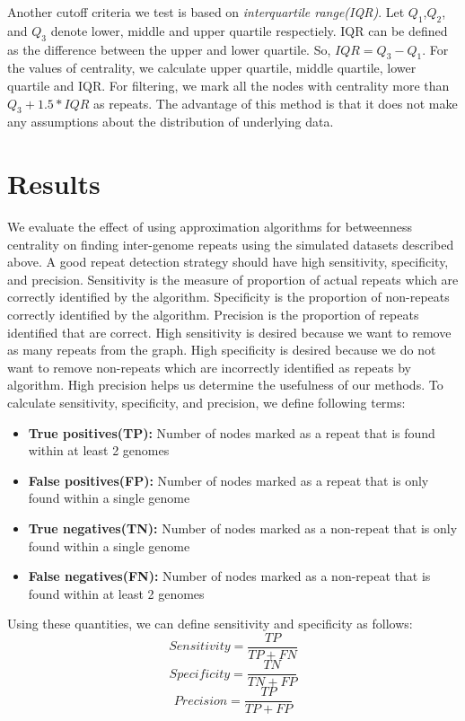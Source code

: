 \documentclass[runningheads,a4paper]{llncs}
\begin{document}
Another cutoff criteria we test is based on \textit{interquartile range(IQR)}. Let $Q_{1}$,$Q_{2}$, and $Q_{3}$ denote lower, middle and upper quartile respectiely. IQR can be defined as the difference between the upper and lower quartile. So, $IQR = Q_{3} - Q_{1}$. For the values of centrality, we calculate upper quartile, middle quartile, lower quartile and IQR. For filtering, we mark all the nodes with centrality more than $Q_{3} + 1.5*IQR$ as repeats. The advantage of this method is that it does not make any assumptions about the distribution of underlying data.  

\section{Results} 
We evaluate the effect of using approximation algorithms for betweenness centrality on finding inter-genome repeats using the simulated datasets described above.
A good repeat detection strategy should have high sensitivity, specificity, and precision. Sensitivity is the measure of proportion of actual repeats which are correctly identified by the algorithm. Specificity is the proportion of non-repeats correctly identified by the algorithm. Precision is the proportion of repeats identified that are correct. High sensitivity is desired because we want to remove as many repeats from the graph. High specificity is desired because we do not want to remove non-repeats which are incorrectly identified as repeats by algorithm. High precision helps us determine the usefulness of our methods. To calculate sensitivity, specificity, and precision, we define following terms:
\begin{itemize}
\item \textbf{True positives(TP):} Number of nodes marked as a repeat that is found within at least 2 genomes
\item \textbf{False positives(FP):} Number of nodes marked as a repeat that is only found within a single genome
\item \textbf{True negatives(TN):} Number of nodes marked as a non-repeat that is only found within a single genome
\item \textbf{False negatives(FN):} Number of nodes marked as a non-repeat that is found within at least 2 genomes
\end{itemize}

Using these quantities, we can define sensitivity and specificity as follows:
 $$Sensitivity = \frac{TP}{TP+FN}$$
 $$Specificity = \frac{TN}{TN+FP}$$
 $$Precision = \frac{TP}{TP + FP}$$
\end{document}
